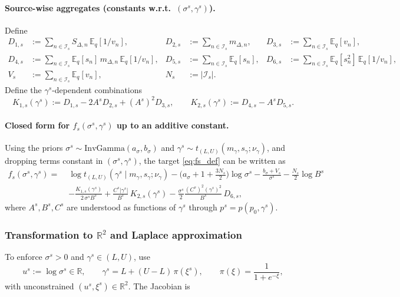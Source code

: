 \documentclass[11pt]{article}
\newcommand{\R}{\mathbb{R}}
\newcommand{\1}{\mathbb{I}}
\newcommand{\IG}{\mathrm{InvGamma}}
\newcommand{\E}{\mathbb{E}}
\begin{document}
\paragraph{Source-wise aggregates (constants w.r.t.\ $(\sigma^s,\gamma^s)$).}
Define
\begin{align}
D_{1,s} &:= \sum_{n\in\mathcal{I}_s} S_{\Delta,n}\,\E_q[1/v_n],&
D_{2,s} &:= \sum_{n\in\mathcal{I}_s} m_{\Delta,n},&
D_{3,s} &:= \sum_{n\in\mathcal{I}_s} \E_q[v_n],\nonumber\\
D_{4,s} &:= \sum_{n\in\mathcal{I}_s} \E_q[s_n]\,m_{\Delta,n}\,\E_q[1/v_n],&
D_{5,s} &:= \sum_{n\in\mathcal{I}_s} \E_q[s_n],&
D_{6,s} &:= \sum_{n\in\mathcal{I}_s} \E_q[s_n^2]\,\E_q[1/v_n],\label{eq:D_defs}\\
V_s &:= \sum_{n\in\mathcal{I}_s} \E_q[v_n],&
N_s &:= |\mathcal{I}_s|.\nonumber
\end{align}
Define the $\gamma^s$-dependent combinations
\begin{equation}
K_{1,s}(\gamma^s):=D_{1,s}-2A^s D_{2,s}+(A^s)^2 D_{3,s},
\qquad
K_{2,s}(\gamma^s):=D_{4,s}-A^s D_{5,s}.
\label{eq:K_defs}
\end{equation}

\paragraph{Closed form for $f_s(\sigma^s,\gamma^s)$ up to an additive constant.}
Using the priors $\sigma^s\sim \IG(a_\sigma,b_\sigma)$ and $\gamma^s\sim t_{(L,U)}(m_\gamma,s_\gamma;\nu_\gamma)$,
and dropping terms constant in $(\sigma^s,\gamma^s)$, the target \eqref{eq:fs_def} can be written as
\begin{align}
f_s(\sigma^s,\gamma^s)
=\;&
\log t_{(L,U)}(\gamma^s\mid m_\gamma,s_\gamma;\nu_\gamma)
-\Big(a_\sigma+1+\frac{3N_s}{2}\Big)\log\sigma^s
-\frac{b_\sigma+V_s}{\sigma^s}
-\frac{N_s}{2}\log B^s \nonumber\\
&-\frac{K_{1,s}(\gamma^s)}{2\,\sigma^s B^s}
+\frac{C^s|\gamma^s|}{B^s}\,K_{2,s}(\gamma^s)
-\frac{\sigma^s}{2}\frac{(C^s)^2(\gamma^s)^2}{B^s}\,D_{6,s},
\label{eq:fs_closed}
\end{align}
where $A^s,B^s,C^s$ are understood as functions of $\gamma^s$ through $p^s=p(p_0,\gamma^s)$.

\subsubsection*{Transformation to $\R^2$ and Laplace approximation}

To enforce $\sigma^s>0$ and $\gamma^s\in(L,U)$, use
\begin{equation}
u^s := \log\sigma^s \in \R,
\qquad
\gamma^s = L + (U-L)\,\pi(\xi^s),
\qquad
\pi(\xi)=\frac{1}{1+e^{-\xi}},
\label{eq:transform_u_xi}
\end{equation}
with unconstrained $(u^s,\xi^s)\in\R^2$. The Jacobian is
\end{document}
